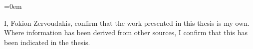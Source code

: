 \vspace*{\fill}

{
\parindent=0em

I, Fokion Zervoudakis, confirm that the work presented in this thesis is my own. Where information has been derived from other sources, I confirm that this has been indicated in the thesis.
}

\vspace*{\fill}
